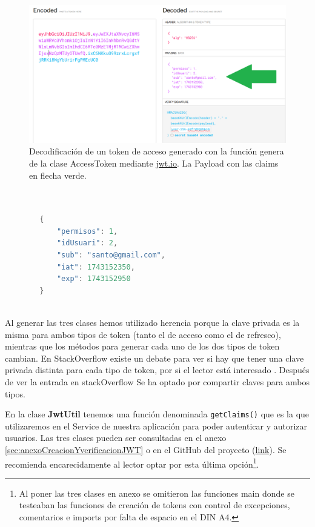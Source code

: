 \documentclass[a4paper,12pt]{report}
\begin{document}
	
			\setlength{\belowcaptionskip}{3pt}
			\FloatBarrier
			\begin{figure}[H]
				\centering
				\caption{Decodificación de un token de acceso generado con la función genera de la clase AccessToken mediante \href{https://www.jwt.io}{jwt.io}. La Payload con las claims en flecha verde.}
				\includegraphics[width=1\textwidth]{img/jwtio_mostra_payload.png}

				\label{fig:jwtioMostraPayload} 
			\end{figure}
			\FloatBarrier

		
\begin{lstlisting}[language=Java, basicstyle=\ttfamily\footnotesize, keywordstyle=\color{magenta}]
			
		
		{
		    "permisos": 1,
		    "idUsuari": 2,
		    "sub": "santo@gmail.com",
		    "iat": 1743152350,
		    "exp": 1743152950
		}
			
\end{lstlisting}
		
		
		
		
		
		Al generar las tres clases hemos utilizado herencia porque la clave privada es la misma para ambos tipos de token (tanto el de acceso como el de refresco), mientras que los métodos para generar cada uno de los dos tipos de token cambian. En StackOverflow existe un debate para ver si hay que tener una clave privada distinta para cada tipo de token, por si el lector está interesado \cite{stackoverflow_jwt_refresh_token_secret}. Después de ver la entrada en stackOverflow Se ha optado por compartir claves para ambos tipos.
		
		
		En la clase \textbf{JwtUtil} tenemos una función denominada \texttt{getClaims()} que es la que utilizaremos en el Service de nuestra aplicación para poder autenticar y autorizar usuarios. Las tres clases pueden ser consultadas en el anexo \ref{sec:anexoCreacionYverificacionJWT} o en el GitHub del proyecto (\href{https://github.com/blackcub3s/mercApp/blob/main/APP%20WEB/__springboot__produccio__/app/src/main/java/miApp/app/seguretat/jwt}{link}). Se recomienda encarecidamente al lector optar por esta última opción\footnote{Al poner las tres clases en anexo se omitieron las funciones main donde se testeaban las funciones de creación de tokens con control de excepciones, comentarios e imports por falta de espacio en el DIN A4.}.
		
\end{document}
